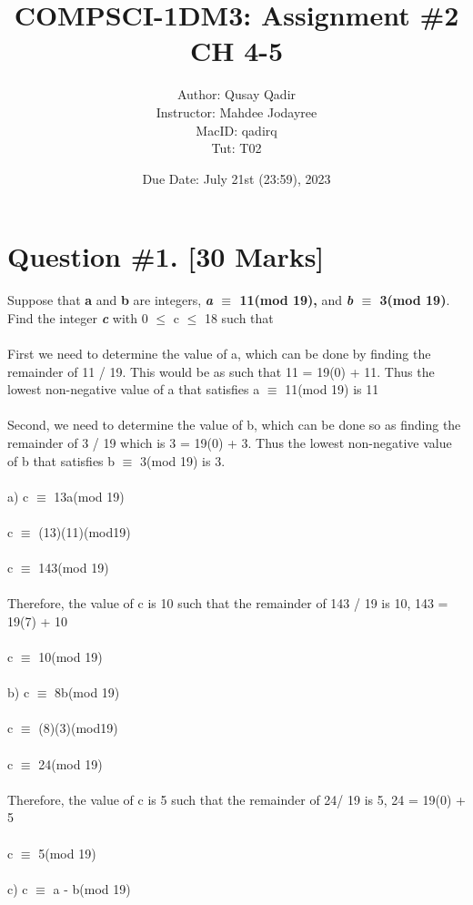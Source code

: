 \documentclass{article}
\title{
\LARGE COMPSCI-1DM3: Assignment \#2 CH 4-5 \\
}
\author{\Large Author: Qusay Qadir \\
\large Instructor: Mahdee Jodayree \\ MacID: qadirq  \\Tut: T02 \\ }
\date{Due Date: July 21st (23:59), 2023}
\begin{document}
\maketitle
\newpage
\tableofcontents
\newpage

\section{Question \#1. [30 Marks]}
Suppose that \textbf{a} and \textbf{b} are integers, \textbf{\emph{a}  $\equiv$ 11(mod 19),}  and \textbf{\emph{b }$\equiv$ 3(mod 19)}. Find the integer \textbf{\emph{c}} with 0 $\leq$ c $\leq$ 18 such that \\\\
First we need to determine the value of a, which can be done by finding the remainder of 11 / 19. This would be as such that 
11 = 19(0) + 11. Thus the lowest non-negative value of a that satisfies a $\equiv$ 11(mod 19) is 11 \\\\
Second, we need to determine the value of b, which can be done so as finding the remainder of 3 / 19 which is 3 = 19(0) + 3. Thus the lowest non-negative value of b that satisfies b $\equiv$ 3(mod 19) is 3.\\\\
a) c $\equiv$ 13a(mod 19) \\  \\
c $\equiv$ (13)(11)(mod19)\\\\
c $\equiv$ 143(mod 19) \\\\
Therefore, the value of c is 10 such that the remainder of 143 / 19 is 10,  143 = 19(7) + 10 \\\\
c $\equiv$ 10(mod 19) \\\\
b) c $\equiv$ 8b(mod 19) \\\\
c $\equiv$ (8)(3)(mod19)\\\\
c $\equiv$ 24(mod 19) \\\\
Therefore, the value of c is 5 such that the remainder of 24/ 19 is 5,  24 = 19(0) + 5  \\\\
c $\equiv$ 5(mod 19) \\\\
c) c $\equiv$ a - b(mod 19) \\\\
\end{document}
